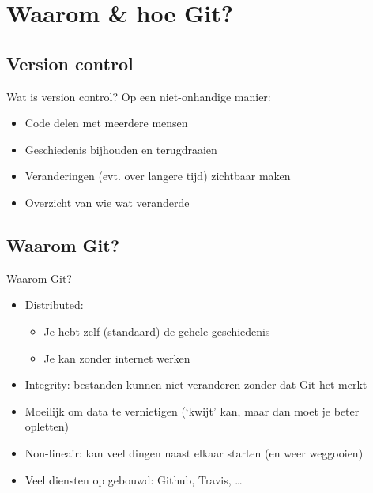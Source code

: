 \section[W\&H?]{Waarom \& hoe Git?}

\subsection{Version control}
\begin{frame}{Wat is version control?}
	Op een niet-onhandige manier:
		\begin{itemize}
			\item Code delen met meerdere mensen
			\item Geschiedenis bijhouden en terugdraaien
			\item Veranderingen (evt. over langere tijd) zichtbaar maken
			\item Overzicht van wie wat veranderde
		\end{itemize}
\end{frame}

\subsection{Waarom Git?}
\begin{frame}{Waarom Git?}
	\begin{itemize}
		\item Distributed:
			\begin{itemize}
				\item Je hebt zelf (standaard) de gehele geschiedenis
				\item Je kan zonder internet werken
			\end{itemize}
		\item Integrity: bestanden kunnen niet veranderen zonder dat Git het merkt
		\item Moeilijk om data te vernietigen (`kwijt' kan, maar dan moet je beter opletten)
		\item Non-lineair: kan veel dingen naast elkaar starten (en weer weggooien)
		\item Veel diensten op gebouwd: Github, Travis, \ldots
	\end{itemize}
\end{frame}

